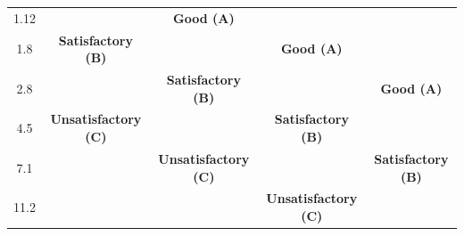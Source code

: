 \begin{table}[h]
\begin{adjustbox}{width=\columnwidth,center}
\begin{tabular}{|c|c|c|c|c|}
1.12                                                                                 & \cellcolor[HTML]{FFFC9E}                                                  & \multirow{-4}{*}{\cellcolor[HTML]{9AFF99}\textbf{Good (A)}}                 & \cellcolor[HTML]{9AFF99}                                                                     & \cellcolor[HTML]{9AFF99}                                                                      \\ \cline{1-1} \cline{3-3}
1.8                                                                                  & \multirow{-2}{*}{\cellcolor[HTML]{FFFC9E}\textbf{Satisfactory (B)}}       & \cellcolor[HTML]{FFFC9E}                                                    & \multirow{-5}{*}{\cellcolor[HTML]{9AFF99}\textbf{Good (A)}}                                  & \cellcolor[HTML]{9AFF99}                                                                      \\ \cline{1-2} \cline{4-4}
2.8                                                                                  & \cellcolor[HTML]{F8A102}                                                  & \multirow{-2}{*}{\cellcolor[HTML]{FFFC9E}\textbf{Satisfactory (B)}}         & \cellcolor[HTML]{FFFC9E}                                                                     & \multirow{-6}{*}{\cellcolor[HTML]{9AFF99}\textbf{Good (A)}}                                   \\ \cline{1-1} \cline{3-3} \cline{5-5}
4.5                                                                                  & \multirow{-2}{*}{\cellcolor[HTML]{F8A102}\textbf{Unsatisfactory (C)}}     & \cellcolor[HTML]{F8A102}                                                    & \multirow{-2}{*}{\cellcolor[HTML]{FFFC9E}\textbf{Satisfactory (B)}}                          & \cellcolor[HTML]{FFFC9E}                                                                      \\ \cline{1-2} \cline{4-4}
7.1                                                                                  & \cellcolor[HTML]{FD6864}                                                  & \multirow{-2}{*}{\cellcolor[HTML]{F8A102}\textbf{Unsatisfactory (C)}}       & \cellcolor[HTML]{F8A102}                                                                     & \multirow{-2}{*}{\cellcolor[HTML]{FFFC9E}\textbf{Satisfactory (B)}}                           \\ \cline{1-1} \cline{3-3} \cline{5-5}
11.2                                                                                 & \cellcolor[HTML]{FD6864}                                                  & \cellcolor[HTML]{FD6864}                                                    & \multirow{-2}{*}{\cellcolor[HTML]{F8A102}\textbf{Unsatisfactory (C)}}                        & \cellcolor[HTML]{F8A102}                                                                      \\ \cline{1-1} \cline{4-4}

\end{tabular}
\end{adjustbox}
\end{table}
